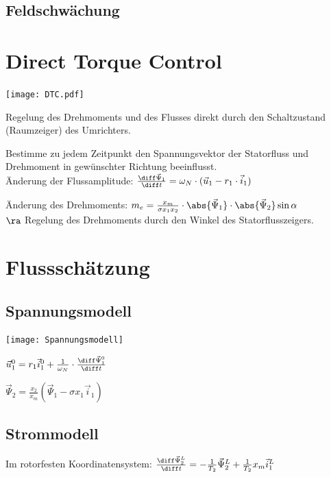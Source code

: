 \documentclass[german]{latex4ei_fs}
\begin{document}
\begin{sectionbox}
\subsection{Feldschwächung}    
\end{sectionbox}
\section{Direct Torque Control} 
\begin{sectionbox}
\texttt{[image: DTC.pdf]}


Regelung des Drehmoments und des Flusses direkt durch den Schaltzustand (Raumzeiger) des Umrichters.

Bestimme zu jedem Zeitpunkt den Spannungsvektor der Statorfluss und Drehmoment in gewünschter Richtung beeinflusst. \\


Änderung der Flussamplitude: $\frac{\diff \vec \Psi_1}{\diff t} = \omega_N \cdot (\vec u_1 - r_1 \cdot \vec i_1)$

Änderung des Drehmoments: $m_e = \frac{x_m}{\sigma x_1 x_2} \cdot \abs{\vec \Psi_1} \cdot \abs{\vec \Psi_2} \sin \alpha$ \\
$\ra $ Regelung des Drehmoments durch den Winkel des Statorflusszeigers.
\end{sectionbox}

\section{Flussschätzung} 

\begin{sectionbox}
\subsection{Spannungsmodell}

\texttt{[image: Spannungsmodell]} 

$\vec u_1^0 = r_1 \vec i_1^0 + \frac{1}{\omega_N} \cdot \frac{\diff \vec \Psi_1^0}{\diff t}$

$\vec \Psi_2 = \frac{x_2}{x_m} (\vec \Psi_1 - \sigma x_1 \vec i_1 )$
\end{sectionbox}

\begin{sectionbox}
\subsection{Strommodell}

Im rotorfesten Koordinatensystem: 
$\frac{\diff \vec \Psi_2^L}{\diff t} = - \frac{1}{T_2} \vec \Psi_2^L + \frac{1}{T_2} x_m \vec i_1^L$
\end{sectionbox}
\end{document}
